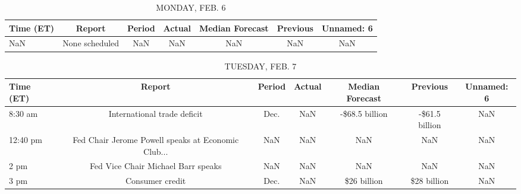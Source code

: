 \documentclass{article}%
\begin{document}
%
\normalsize%


\begin{table}[htbp]%
\caption{MONDAY, FEB. 6}%
\centering%
\begin{adjustbox}{width=1\textwidth}%
\begin{tabular}{lcccccc}
\toprule
Time (ET) &         Report & Period & Actual & Median Forecast & Previous & Unnamed: 6 \\
\midrule
      NaN & None scheduled &    NaN &    NaN &             NaN &      NaN &        NaN \\
\bottomrule
\end{tabular}
%
\end{adjustbox}%
\end{table}

%


\begin{table}[htbp]%
\caption{TUESDAY, FEB. 7}%
\centering%
\begin{adjustbox}{width=1\textwidth}%
\begin{tabular}{lcccccc}
\toprule
Time (ET) &                                             Report & Period & Actual & Median Forecast &       Previous & Unnamed: 6 \\
\midrule
  8:30 am &                        International trade deficit &   Dec. &    NaN &  -\$68.5 billion & -\$61.5 billion &        NaN \\
 12:40 pm & Fed Chair Jerome Powell speaks at Economic Club... &    NaN &    NaN &             NaN &            NaN &        NaN \\
     2 pm &                 Fed Vice Chair Michael Barr speaks &    NaN &    NaN &             NaN &            NaN &        NaN \\
     3 pm &                                    Consumer credit &   Dec. &    NaN &     \$26 billion &    \$28 billion &        NaN \\
\bottomrule
\end{tabular}
%
\end{adjustbox}%
\end{table}

%
\end{document}
